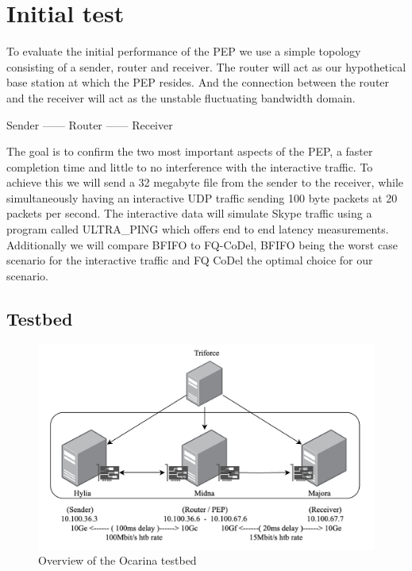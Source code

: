 \documentclass[a4paper,english, 11pt]{report}
\begin{document}

\section{Initial test}
To evaluate the initial performance of the PEP we use a simple topology consisting of a sender, router and receiver. The router will act as our hypothetical base station at which the PEP resides. And the connection between the router and the receiver will act as the unstable fluctuating bandwidth domain.

\begin{center}
Sender ------ Router ------ Receiver\\
\end{center}

The goal is to confirm the two most important aspects of the PEP, a faster completion time and little to no interference with the interactive traffic. To achieve this we will send a 32 megabyte file from the sender to the receiver, while simultaneously having an interactive UDP traffic sending 100 byte packets at 20 packets per second. The interactive data will simulate Skype traffic using a program called ULTRA\_PING\cite{rahtz2023ultraping} which offers end to end latency measurements.\\

Additionally we will compare BFIFO to FQ-CoDel, BFIFO being the worst case scenario for the interactive traffic and FQ CoDel the optimal choice for our scenario.

\subsection{Testbed}

\begin{figure}[h!] %
	\centering
	\includegraphics[scale=0.60]{../diagrams/drawio/testbed.png}
  	\caption{Overview of the Ocarina testbed}
  	\label{fig:testbed}
\end{figure}
\end{document}
